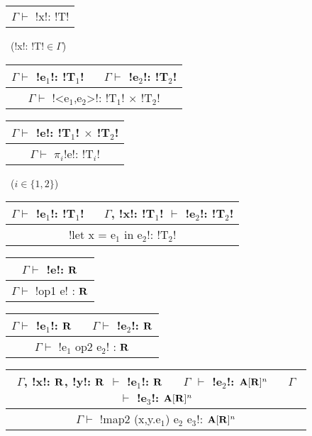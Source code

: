 \begin{figure*}[tb]
    \centering
    \begin{tabular}{c} 
    \\\hline
    $\Gamma \vdash$ !x!: !T!
    \end{tabular}~(!x!: !T!$\in\Gamma$)
    \hspace{0.5cm}
    \begin{tabular}{c}
    $\Gamma \vdash$ !e$_1$!: !T$_1$! $\quad$ $\Gamma \vdash$ !e$_2$!: !T$_2$! \\\hline  
    $\Gamma \vdash$ !<e$_1$,e$_2$>!: !T$_1$! $\times$ !T$_2$!
    \end{tabular}
    \hspace{0.5cm}
    \begin{tabular}{c}
        $\Gamma \vdash$ !e!: !T$_1$! $\times$ !T$_2$! \\\hline  
        $\Gamma \vdash$ $\pi_i$!e!: !T$_i$!
    \end{tabular}~($i\in\{1,2\}$)

    \begin{tabular}{c}
    $\Gamma \vdash$ !e$_1$!: !T$_1$! $\quad$ $\Gamma$, !x!: !T$_1$! $\vdash$ !e$_2$!: !T$_2$! \\\hline
    !let x = e$_1$ in e$_2$!: !T$_2$!
    \end{tabular}
    \hspace{0.5cm}
    \begin{tabular}{c}
        $\Gamma \vdash$ !e!: $\mathbf{R}$ \\\hline  
        $\Gamma \vdash$ !op1 e! : $\mathbf{R}$
    \end{tabular}
    \hspace{0.5cm}
    \begin{tabular}{c}
        $\Gamma \vdash$ !e$_1$!: $\mathbf{R}$ $\quad$ $\Gamma \vdash$ !e$_2$!: $\mathbf{R}$ \\\hline  
        $\Gamma \vdash$ !e$_1$ op2 e$_2$! : $\mathbf{R}$
        \end{tabular}
 
    \begin{tabular}{c}
        $\Gamma$, !x!: $\mathbf{R}$, !y!: $\mathbf{R}$ $\vdash$ !e$_1$!: $\mathbf{R}$ 
        $\quad$ $\Gamma$ $\vdash$ !e$_2$!: $\mathbf{A}[\mathbf{R}]^{n}$
        $\quad$ $\Gamma$ $\vdash$ !e$_3$!: $\mathbf{A}[\mathbf{R}]^{n}$
        \\\hline  
        $\Gamma \vdash$ !map2 (x,y.e$_1$) e$_2$ e$_3$!: $\mathbf{A}[\mathbf{R}]^{n}$
    \end{tabular}


\end{figure*}
